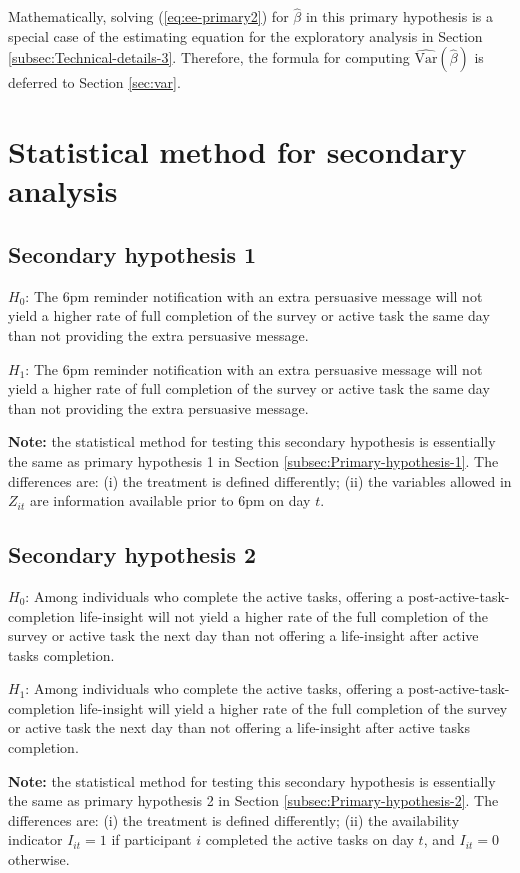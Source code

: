 \documentclass[11pt]{article}
\begin{document}
Mathematically, solving (\ref{eq:ee-primary2}) for $\hat{\beta}$
in this primary hypothesis is a special case of the estimating equation for the exploratory analysis
in Section \ref{subsec:Technical-details-3}. Therefore, the formula for
computing $\widehat{\text{Var}}(\hat{\beta})$ is deferred to Section
\ref{sec:var}.

\section{Statistical method for secondary analysis}

\subsection{Secondary hypothesis 1}

$H_{0}$: The 6pm reminder notification with an extra persuasive message
will not yield a higher rate of full completion of the survey or active
task the same day than not providing the extra persuasive message.

$H_{1}$: The 6pm reminder notification with an extra persuasive message
will not yield a higher rate of full completion of the survey or active
task the same day than not providing the extra persuasive message.

\textbf{Note:} the statistical method for testing this secondary hypothesis
is essentially the same as primary hypothesis 1 in Section \ref{subsec:Primary-hypothesis-1}.
The differences are: (i) the treatment is defined differently; (ii)
the variables allowed in $Z_{it}$ are information available prior
to 6pm on day $t$.

\subsection{Secondary hypothesis 2}

$H_{0}$: Among individuals who complete the active tasks, offering
a post-active-task-completion life-insight will not yield a higher
rate of the full completion of the survey or active task the next
day than not offering a life-insight after active tasks completion.

$H_{1}$: Among individuals who complete the active tasks, offering
a post-active-task-completion life-insight will yield a higher rate
of the full completion of the survey or active task the next day than
not offering a life-insight after active tasks completion.

\textbf{Note:} the statistical method for testing this secondary hypothesis
is essentially the same as primary hypothesis 2 in Section \ref{subsec:Primary-hypothesis-2}.
The differences are: (i) the treatment is defined differently; (ii)
the availability indicator $I_{it}=1$ if participant $i$ completed
the active tasks on day $t$, and $I_{it}=0$ otherwise.
\end{document}
